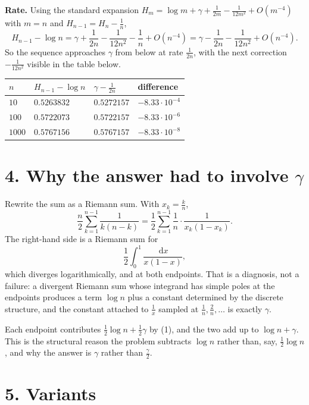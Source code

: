 \documentclass[12pt]{article}
\newcommand{\dd}{\,\mathrm{d}}
\newcommand{\Hh}{H}
\begin{document}
\textbf{Rate.} Using the standard expansion
\(\Hh_m=\log m+\gamma+\frac1{2m}-\frac1{12m^2}+O(m^{-4})\) with \(m=n\)
and \(\Hh_{n-1}=\Hh_n-\frac1n\),
\[
\Hh_{n-1}-\log n
=\gamma+\frac1{2n}-\frac1{12n^2}-\frac1n+O(n^{-4})
=\gamma-\frac1{2n}-\frac1{12n^2}+O(n^{-4}).
\tag{5}
\]
So the sequence approaches \(\gamma\) from below at rate \(\frac1{2n}\),
with the next correction \(-\frac1{12n^2}\) visible in the table below.

\begin{center}
\small
\renewcommand{\arraystretch}{1.35}
\begin{tabularx}{0.9\textwidth}{@{}lXXX@{}}
\toprule
\(n\) & \(\Hh_{n-1}-\log n\) & \(\gamma-\frac1{2n}\) & difference \\
\midrule
\(10\)    & \(0.5263832\) & \(0.5272157\) & \(-8.33\cdot10^{-4}\) \\
\(100\)   & \(0.5722073\) & \(0.5722157\) & \(-8.33\cdot10^{-6}\) \\
\(1000\)  & \(0.5767156\) & \(0.5767157\) & \(-8.33\cdot10^{-8}\) \\
\bottomrule
\end{tabularx}
\end{center}

\section*{4. Why the answer had to involve \(\gamma\)}

Rewrite the sum as a Riemann sum. With \(x_k=\frac kn\),
\[
\frac n2\sum_{k=1}^{n-1}\frac1{k(n-k)}
=\frac12\sum_{k=1}^{n-1}\frac1n\cdot\frac1{x_k(1-x_k)} .
\tag{6}
\]
The right-hand side is a Riemann sum for
\[
\frac12\int_0^1\frac{\dd x}{x(1-x)},
\]
which diverges logarithmically, and at both endpoints. That is a
diagnosis, not a failure: a divergent Riemann sum whose integrand has
simple poles at the endpoints produces a term \(\log n\) plus a constant
determined by the discrete structure, and the constant attached to
\(\frac1x\) sampled at \(\frac1n,\frac2n,\dots\) is exactly \(\gamma\).

Each endpoint contributes \(\frac12\log n+\frac12\gamma\) by (1), and the
two add up to \(\log n+\gamma\). This is the structural reason the
problem subtracts \(\log n\) rather than, say, \(\frac12\log n\), and why
the answer is \(\gamma\) rather than \(\frac\gamma2\).

\section*{5. Variants}
\end{document}
